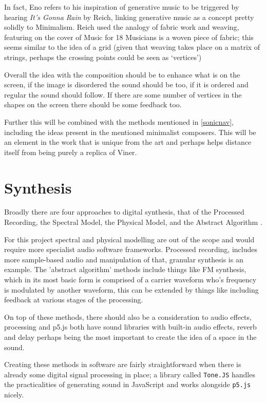 In fact, Eno refers to his inspiration of generative music to be triggered by
hearing \emph{It's Gonna Rain} by Reich, linking generative music as a concept
pretty solidly to Minimalism. Reich used the analogy of fabric work and weaving,
featuring on the cover of Music for 18 Musicians is a woven piece of fabric;
this seems similar to the idea of a grid (given that weaving takes place on a
matrix of strings, perhaps the crossing points could be seen as `vertices')

Overall the idea with the composition should be to enhance what is on the
screen, if the image is disordered the sound should be too, if it is ordered
and regular the sound should follow. If there are some number of vertices in the
shapes on the screen there should be some feedback too.

Further this will be combined with the methods mentioned in
\autoref{sonicnav}, including the ideas present in the mentioned minimalist
composers. This will be an element in the work that is unique from the art and
perhaps helps distance itself from being purely a replica of Viner.

\section{Synthesis}
Broadly there are four approaches to digital synthesis, that of the Processed
Recording, the Spectral Model, the Physical Model, and the Abstract Algorithm
\citep{smith_2005}.

For this project spectral and physical modelling are out of the scope and would
require more specialist audio software frameworks. Processed recording, includes
more sample-based audio and manipulation of that, granular synthesis is an
example. The 'abstract algorithm' methods include things like FM synthesis,
which in its most basic form is comprised of a carrier waveform who's frequency
is modulated by another waveform, this can be extended by things like including
feedback at various stages of the processing.

On top of these methods, there should also be a consideration to audio effects,
processing and p5.js both have sound libraries with built-in audio effects,
reverb and delay perhaps being the most important to create the idea of a space
in the sound.

Creating these methods in software are fairly straightforward when there is
already some digital signal processing in place; a library called
\verb|Tone.JS| handles the practicalities of generating sound in JavaScript and
works alongside \verb|p5.js| nicely.

